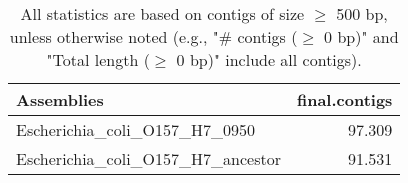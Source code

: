 \documentclass[12pt,a4paper]{article}
\begin{document}
\begin{table}[ht]
\begin{center}
\caption{All statistics are based on contigs of size $\geq$ 500 bp, unless otherwise noted (e.g., "\# contigs ($\geq$ 0 bp)" and "Total length ($\geq$ 0 bp)" include all contigs).}
\begin{tabular}{|l*{1}{|r}|}
\hline
Assemblies & final.contigs \\ \hline
Escherichia\_coli\_O157\_H7\_0950 & 97.309 \\ \hline
Escherichia\_coli\_O157\_H7\_ancestor & 91.531 \\ \hline
\end{tabular}
\end{center}
\end{table}
\end{document}

